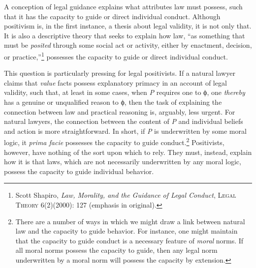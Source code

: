 A conception of legal guidance explains what attributes law must
possess, such that it has the capacity to guide or direct individual
conduct. Although positivism is, in the first instance, a thesis about
legal validity, it is not only that. It is also a descriptive theory
that seeks to explain how law, ``as something that must be
\emph{posited} through some social act or activity, either by enactment,
decision, or practice,''\footnote{Scott Shapiro, \emph{Law, Morality,
  and the Guidance of Legal Conduct}, \textsc{Legal Theory} 6(2)(2000):
  127 (emphasis in original).} possesses the capacity to guide or direct
individual conduct.

This question is particularly pressing for legal positivists. If a
natural lawyer claims that \emph{value} facts possess explanatory
primacy in an account of legal validity, such that, at least in some
cases, when \emph{P} requires one to ϕ, one \emph{thereby} has a genuine
or unqualified reason to ϕ, then the task of explaining the connection
between law and practical reasoning is, arguably, less urgent. For
natural lawyers, the connection between the content of \emph{P} and
individual beliefs and action is more straightforward. In short, if
\emph{P} is underwritten by some moral logic, it \emph{prima facie}
possesses the capacity to guide conduct.\footnote{There are a number of
  ways in which we might draw a link between natural law and the
  capacity to guide behavior. For instance, one might maintain that the
  capacity to guide conduct is a necessary feature of \emph{moral}
  norms. If all moral norms possess the capacity to guide, then any
  legal norm underwritten by a moral norm will possess the capacity by
  extension.} Positivists, however, have nothing of the sort upon which
to rely. They must, instead, explain how it is that laws, which are not
necessarily underwritten by any moral logic, possess the capacity to
guide individual behavior.

